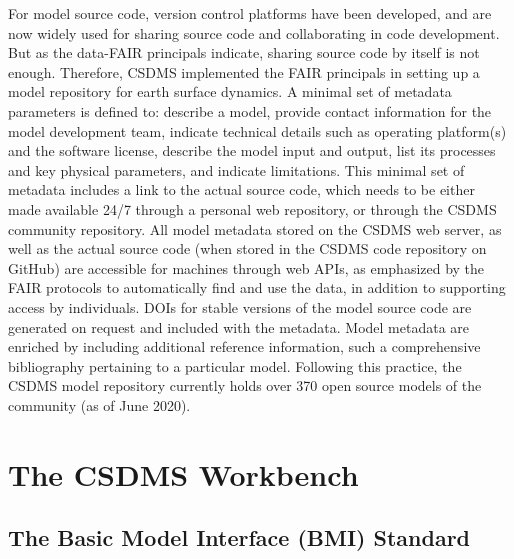 \documentclass[12pt]{amsart}
\begin{document}
For model source code, version control platforms have been developed, and are now widely used for sharing source code and collaborating in code development. But as the data-FAIR principals indicate, sharing source code by itself is not enough. Therefore, CSDMS implemented the FAIR principals in setting up a model repository for earth surface dynamics. A minimal set of metadata parameters is defined to: describe a model, provide contact information for the model development team, indicate technical details such as operating platform(s) and the software license, describe the model input and output, list its processes and key physical parameters, and indicate limitations. This minimal set of metadata includes a link to the actual source code, which needs to be either made available 24/7 through a personal web repository, or through the CSDMS community repository. All model metadata stored on the CSDMS web server, as well as the actual source code (when stored in the CSDMS code repository on GitHub) are accessible for machines through web APIs, as emphasized by the FAIR protocols to automatically find and use the data, in addition to supporting access by individuals. DOIs for stable versions of the model source code are generated on request and included with the metadata. Model metadata are enriched by including additional reference information, such a comprehensive bibliography pertaining to a particular model. Following this practice, the CSDMS model repository currently holds over 370 open source models of the community (as of June 2020).


\section{The CSDMS Workbench}
\label{sec:workbench}

\subsection{The Basic Model Interface (BMI) Standard}



\end{document}
